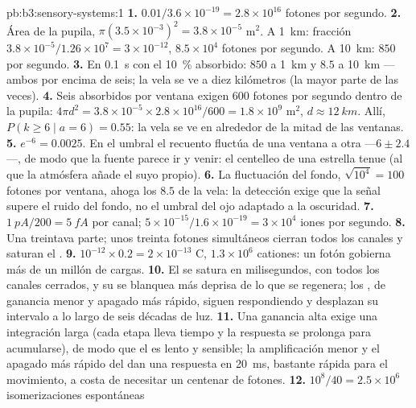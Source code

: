 \begin{solution}{pb:b3:sensory-systems:1}
\textbf{1.} $0.01/3.6\times 10^{-19} = 2.8\times 10^{16}$ fotones por
segundo.
\textbf{2.} Área de la pupila, $\pi(3.5\times 10^{-3})^{2} = 3.8\times 10^{-5}$
m$^{2}$. A \qty{1}{km}: fracción $3.8\times 10^{-5}/1.26\times 10^{7} =
3\times 10^{-12}$, $8.5\times 10^{4}$ fotones por segundo. A
\qty{10}{km}: $850$ por segundo.
\textbf{3.} En \qty{0.1}{s} con el \qty{10}{\%} absorbido: $850$ a
\qty{1}{km} y $8.5$ a \qty{10}{km} ---ambos por encima de seis; la vela
se ve a diez kilómetros (la mayor parte de las veces).
\textbf{4.} Seis absorbidos por ventana exigen $600$ fotones por segundo
dentro de la pupila: $4\pi d^{2} = 3.8\times 10^{-5}\times 2.8\times 10^{16}/600
= 1.8\times 10^{9}$ m$^{2}$, $d \approx \qty{12}{km}$. Allí, $P(k \ge
6 \mid a = 6) = 0.55$: la vela se ve en alrededor de la mitad de las
ventanas.
\textbf{5.} $e^{-6} = 0.0025$. En el umbral el recuento fluctúa de una
ventana a otra ---$6 \pm 2.4$---, de modo que la fuente parece ir y
venir: el centelleo de una estrella tenue (al que la atmósfera añade el
suyo propio).
\textbf{6.} La fluctuación del fondo, $\sqrt{10^{4}} = 100$ fotones por
ventana, ahoga los $8.5$ de la vela: la detección exige que la señal
supere el ruido del fondo, no el umbral del ojo adaptado a la
oscuridad.
\textbf{7.} $\qty{1}{pA}/200 = \qty{5}{fA}$ por canal; $5\times
10^{-15}/1.6\times 10^{-19} = 3\times 10^{4}$ iones por segundo.
\textbf{8.} Una treintava parte; unos treinta fotones simultáneos
cierran todos los canales y saturan el .
\textbf{9.} $10^{-12}\times 0.2 = 2\times 10^{-13}$ C, $1.3\times 10^{6}$
cationes: un fotón gobierna más de un millón de cargas.
\textbf{10.} El  se satura en milisegundos, con todos los canales
cerrados, y su  se blanquea más deprisa de lo que se regenera;
los , de ganancia menor y apagado más rápido, siguen respondiendo
y desplazan su intervalo a lo largo de seis décadas de luz.
\textbf{11.} Una ganancia alta exige una integración larga (cada etapa
lleva tiempo y la respuesta se prolonga para acumularse), de modo que
el  es lento y sensible; la amplificación menor y el apagado más
rápido del  dan una respuesta en \qty{20}{ms}, bastante rápida para
el movimiento, a costa de necesitar un centenar de fotones.
\textbf{12.} $10^{8}/40 = 2.5\times 10^{6}$ isomerizaciones espontáneas

\end{solution}
